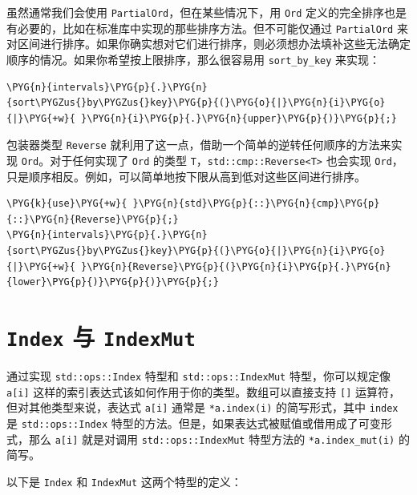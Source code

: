 虽然通常我们会使用 \texttt{PartialOrd}，但在某些情况下，用 \texttt{Ord} 定义的完全排序也是有必要的，比如在标准库中实现的那些排序方法。但不可能仅通过 \texttt{PartialOrd} 来对区间进行排序。如果你确实想对它们进行排序，则必须想办法填补这些无法确定顺序的情况。如果你希望按上限排序，那么很容易用 \texttt{sort\_by\_key} 来实现：

\begin{Verbatim}[commandchars=\\\{\},breaklines=true,breakanywhere=true,fontsize=\codefont,xleftmargin=17bp]
\PYG{n}{intervals}\PYG{p}{.}\PYG{n}{sort\PYGZus{}by\PYGZus{}key}\PYG{p}{(}\PYG{o}{|}\PYG{n}{i}\PYG{o}{|}\PYG{+w}{ }\PYG{n}{i}\PYG{p}{.}\PYG{n}{upper}\PYG{p}{)}\PYG{p}{;}
\end{Verbatim}

包装器类型 \texttt{Reverse} 就利用了这一点，借助一个简单的逆转任何顺序的方法来实现 \texttt{Ord}。对于任何实现了 \texttt{Ord} 的类型 \texttt{T}，\texttt{std::cmp::Reverse<T>} 也会实现 \texttt{Ord}，只是顺序相反。例如，可以简单地按下限从高到低对这些区间进行排序。

\begin{Verbatim}[commandchars=\\\{\},breaklines=true,breakanywhere=true,fontsize=\codefont,xleftmargin=17bp]
\PYG{k}{use}\PYG{+w}{ }\PYG{n}{std}\PYG{p}{::}\PYG{n}{cmp}\PYG{p}{::}\PYG{n}{Reverse}\PYG{p}{;}
\PYG{n}{intervals}\PYG{p}{.}\PYG{n}{sort\PYGZus{}by\PYGZus{}key}\PYG{p}{(}\PYG{o}{|}\PYG{n}{i}\PYG{o}{|}\PYG{+w}{ }\PYG{n}{Reverse}\PYG{p}{(}\PYG{n}{i}\PYG{p}{.}\PYG{n}{lower}\PYG{p}{)}\PYG{p}{)}\PYG{p}{;}
\end{Verbatim}

\section{\texttt{Index} 与 \texttt{IndexMut}}

通过实现 \texttt{std::ops::Index} 特型和 \texttt{std::ops::IndexMut} 特型，你可以规定像 \texttt{a[i]} 这样的索引表达式该如何作用于你的类型。数组可以直接支持 \texttt{[]} 运算符，但对其他类型来说，表达式 \texttt{a[i]} 通常是 \texttt{*a.index(i)} 的简写形式，其中 \texttt{index} 是 \texttt{std::ops::Index} 特型的方法。但是，如果表达式被赋值或借用成了可变形式，那么 \texttt{a[i]} 就是对调用 \texttt{std::ops::IndexMut} 特型方法的 \texttt{*a.index\_mut(i)} 的简写。

以下是 \texttt{Index} 和 \texttt{IndexMut} 这两个特型的定义：

